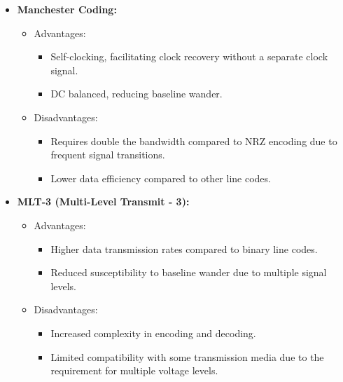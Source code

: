 \documentclass[a4paper, 12pt, english]{article}
\begin{document}
\begin{itemize}
    \item \textbf{Manchester Coding:}
        \begin{itemize}
            \item Advantages:
                \begin{itemize}
                    \item Self-clocking, facilitating clock recovery without a separate clock signal.
                    \item DC balanced, reducing baseline wander.
                \end{itemize}
            \item Disadvantages:
                \begin{itemize}
                    \item Requires double the bandwidth compared to NRZ encoding due to frequent signal transitions.
                    \item Lower data efficiency compared to other line codes.
                \end{itemize}
        \end{itemize}

    \item \textbf{MLT-3 (Multi-Level Transmit - 3):}
        \begin{itemize}
            \item Advantages:
                \begin{itemize}
                    \item Higher data transmission rates compared to binary line codes.
                    \item Reduced susceptibility to baseline wander due to multiple signal levels.
                \end{itemize}
            \item Disadvantages:
                \begin{itemize}
                    \item Increased complexity in encoding and decoding.
                    \item Limited compatibility with some transmission media due to the requirement for multiple voltage levels.
                \end{itemize}
        \end{itemize}
\end{itemize}
\end{document}
